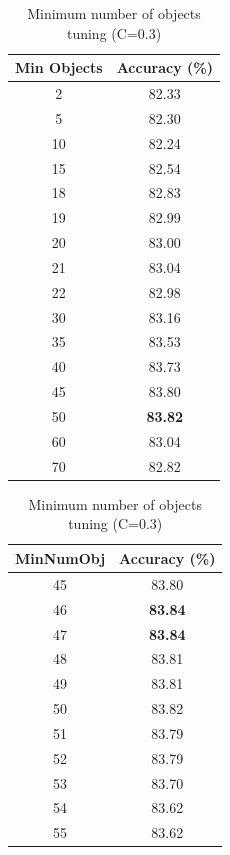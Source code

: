 \documentclass[12pt]{article}
\begin{document}
      \begin{table}[H]
        \begin{subtable}{0.5\linewidth}
          \centering
          \caption{}
            \begin{tabular}{c|c}
            \toprule
            \multicolumn{1}{l|}{Min Objects} & \multicolumn{1}{l}{Accuracy (\%)} \\
            \midrule
            2     & 82.33 \\
            5     & 82.30 \\
            10    & 82.24 \\
            15    & 82.54 \\
            18    & 82.83 \\
            19    & 82.99 \\
            20    & 83.00 \\
            21    & 83.04 \\
            22    & 82.98 \\
            30    & 83.16 \\
            35    & 83.53 \\
            40    & 83.73 \\
            45    & 83.80 \\
            50    & \textbf{83.82} \\
            60    & 83.04 \\
            70    & 82.82 \\
            \bottomrule
            \end{tabular}%
        \end{subtable}
        \begin{subtable}{0.5\linewidth}
          \centering
          \caption{}
            \begin{tabular}{c|c}
            \toprule
            MinNumObj & Accuracy (\%) \\
            \midrule
            45    & 83.80 \\
            46    & \textbf{83.84} \\
            47    & \textbf{83.84} \\
            48    & 83.81 \\
            49    & 83.81 \\
            50    & 83.82 \\
            51    & 83.79 \\
            52    & 83.79 \\
            53    & 83.70 \\
            54    & 83.62 \\
            55    & 83.62 \\
            \bottomrule
            \end{tabular}%
        \end{subtable}
        \label{tab:mno-1}%
        \caption{Minimum number of objects tuning (C=0.3)}
      \end{table}%
\end{document}
